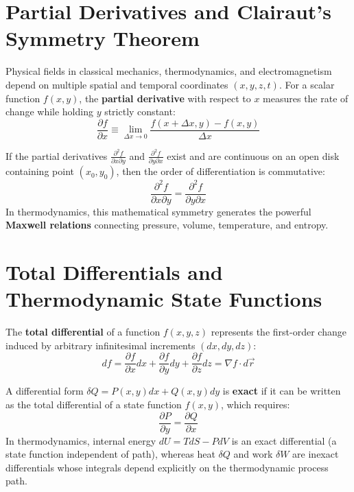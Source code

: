 \section{Partial Derivatives and Clairaut's Symmetry Theorem}
Physical fields in classical mechanics, thermodynamics, and electromagnetism depend on multiple spatial and temporal coordinates $(x, y, z, t)$. For a scalar function $f(x, y)$, the \textbf{partial derivative} with respect to $x$ measures the rate of change while holding $y$ strictly constant:
\begin{equation}
\frac{\partial f}{\partial x} \equiv \lim_{\Delta x \to 0} \frac{f(x + \Delta x, y) - f(x, y)}{\Delta x}
\end{equation}

\begin{maththeorem}
If the partial derivatives $\frac{\partial^2 f}{\partial x \partial y}$ and $\frac{\partial^2 f}{\partial y \partial x}$ exist and are continuous on an open disk containing point $(x_0, y_0)$, then the order of differentiation is commutative:
\begin{equation}
\frac{\partial^2 f}{\partial x \partial y} = \frac{\partial^2 f}{\partial y \partial x}
\end{equation}
In thermodynamics, this mathematical symmetry generates the powerful \textbf{Maxwell relations} connecting pressure, volume, temperature, and entropy.
\end{maththeorem}

\section{Total Differentials and Thermodynamic State Functions}
The \textbf{total differential} of a function $f(x, y, z)$ represents the first-order change induced by arbitrary infinitesimal increments $(dx, dy, dz)$:
\begin{equation}
df = \frac{\partial f}{\partial x}dx + \frac{\partial f}{\partial y}dy + \frac{\partial f}{\partial z}dz = \nabla f \cdot d\vec{r}
\end{equation}

\begin{mathdefinition}
A differential form $\delta Q = P(x, y)dx + Q(x, y)dy$ is \textbf{exact} if it can be written as the total differential of a state function $f(x, y)$, which requires:
\begin{equation}
\frac{\partial P}{\partial y} = \frac{\partial Q}{\partial x}
\end{equation}
In thermodynamics, internal energy $dU = TdS - PdV$ is an exact differential (a state function independent of path), whereas heat $\delta Q$ and work $\delta W$ are inexact differentials whose integrals depend explicitly on the thermodynamic process path.
\end{mathdefinition}

